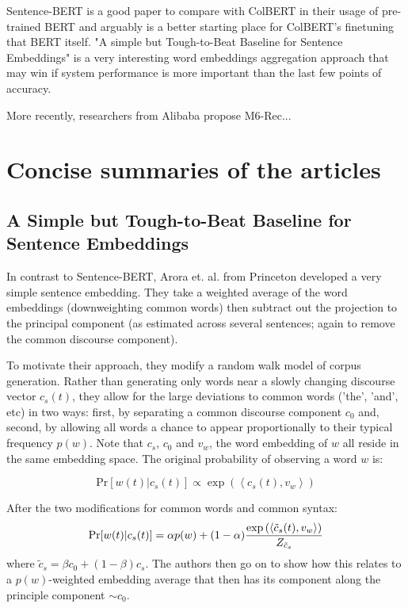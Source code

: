 \documentclass[11pt]{article}
\begin{document}
Sentence-BERT \cite{Reimers2019} is a good paper to compare with ColBERT in their usage of pre-trained BERT and arguably is a better starting place for ColBERT's finetuning that BERT itself. "A simple but Tough-to-Beat Baseline for Sentence Embeddings" \cite{Arora2017} is a very interesting word embeddings aggregation approach that may win if system performance is more important than the last few points of accuracy. 

More recently, researchers from Alibaba propose M6-Rec...

\section{Concise summaries of the articles} 

\subsection{A Simple but Tough-to-Beat Baseline for Sentence Embeddings \cite{Arora2017}}

In contrast to Sentence-BERT, Arora et. al. from Princeton developed a very simple sentence embedding. They take a weighted average of the word embeddings (downweighting common words) then subtract out the projection to the principal component (as estimated across several sentences; again to remove the common discourse component).

To motivate their approach, they modify a random walk model of corpus generation. Rather than generating only words near a slowly changing discourse vector $c_s(t)$, they allow for the large deviations to common words ('the', 'and', etc) in two ways: first, by separating a common discourse component $c_0$ and, second, by allowing all words a chance to appear proportionally to their typical frequency $p(w)$. Note that $c_s$, $c_0$ and $v_w$, the word embedding of $w$ all reside in the same embedding space. The original probability of observing a word $w$ is:

\begin{equation}
  \mathrm{Pr}[w(t)|c_s(t)] \propto \exp\left(\left< c_s(t), v_w \right> \right)
\end{equation}

After the two modifications for common words and common syntax:
\begin{equation}
  \mathrm{Pr}[w(t)|c_s(t)] = \alpha p(w) + (1-\alpha) {\exp\left(\left< \tilde c_s(t), v_w \right> \right) \over Z_{\tilde c_s}}
\end{equation}
where $\tilde c_s = \beta c_0 + (1-\beta)c_s$. The authors then go on to show how this relates to a $p(w)$-weighted embedding average that then has its component along the principle component $\sim c_0$.
\end{document}
